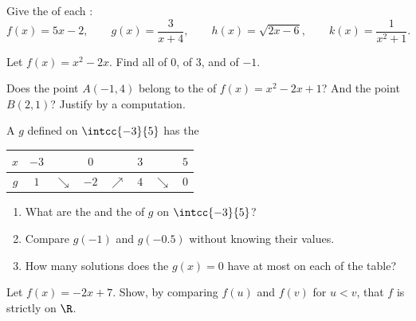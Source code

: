 \begin{exercise}[$\star$]\label{exo:g10:functions:2}
Give the  of each :
\[
f(x) = 5x - 2, \qquad
g(x) = \frac{3}{x + 4}, \qquad
h(x) = \sqrt{2x - 6}, \qquad
k(x) = \frac{1}{x^2 + 1}.
\]
\end{exercise}

\begin{exercise}[$\star$]\label{exo:g10:functions:3}
Let $f(x) = x^2 - 2x$. Find all  of $0$, of $3$, and of $-1$.
\end{exercise}

\begin{exercise}[$\star$]\label{exo:g10:functions:4}
Does the point $A(-1, 4)$ belong to the  of $f(x) = x^2 - 2x + 1$?
And the point $B(2, 1)$? Justify by a computation.
\end{exercise}

\begin{exercise}[$\star$]\label{exo:g10:functions:5}
A  $g$ defined on $\intcc{-3}{5}$ has the 
\begin{center}
\renewcommand{\arraystretch}{1.3}
\begin{tabular}{c|ccccccc}
$x$ & $-3$ & & $0$ & & $3$ & & $5$ \\
\hline
$g$ & $1$ & $\searrow$ & $-2$ & $\nearrow$ & $4$ & $\searrow$ & $0$ \\
\end{tabular}
\end{center}
\begin{enumerate}
  \item What are the  and the  of $g$ on $\intcc{-3}{5}$?
  \item Compare $g(-1)$ and $g(-0.5)$ without knowing their values.
  \item How many solutions does the  $g(x) = 0$ have at most on
        each  of the table?
\end{enumerate}
\end{exercise}

\begin{exercise}[$\star\star$]\label{exo:g10:functions:6}
Let $f(x) = -2x + 7$. Show, by comparing $f(u)$ and $f(v)$ for $u < v$,
that $f$ is strictly  on $\R$.
\end{exercise}

